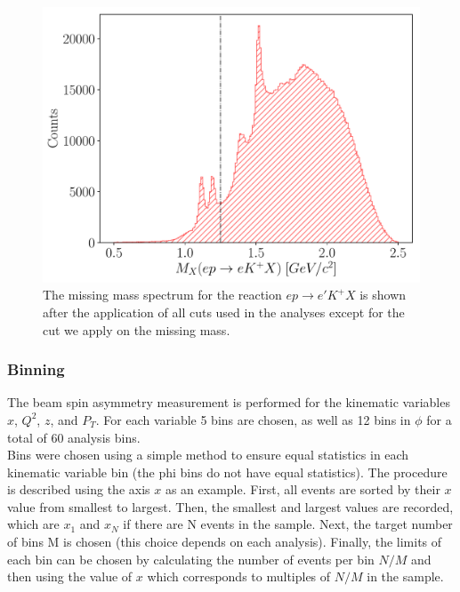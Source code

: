 
\begin{figure}
	\centering
	\includegraphics[width=16cm]{image/plots/kaon-bsa/mx.pdf}
	\caption{The missing mass spectrum for the reaction $ep \rightarrow e'K^+X$ is shown after the application of all cuts used in the analyses except for the cut we apply on the missing mass.}
\end{figure}

\subsubsection*{Binning}

The beam spin asymmetry measurement is performed for the kinematic variables $x$, $Q^2$, $z$, and $P_T$.  For each variable 5 bins are chosen, as well as 12 bins in $\phi$ for a total of 60 analysis bins. \\

Bins were chosen using a simple method to ensure equal statistics in each kinematic variable bin (the phi bins do not have equal statistics).  The procedure is described using the axis $x$ as an example.  First, all events are sorted by their $x$ value from smallest to largest.  Then, the smallest and largest values are recorded, which are $x_1$ and $x_N$ if there are N events in the sample.  Next, the target number of bins M is chosen (this choice depends on each analysis).  Finally, the limits of each bin can be chosen by calculating the number of events per bin $N/M$ and then using the value of $x$ which corresponds to multiples of $N/M$ in the sample.    

